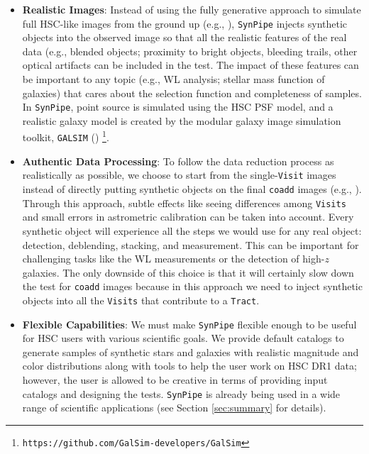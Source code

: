 \documentclass[useamsfonts]{pasj01}
\def\synpipe{\texttt{SynPipe}}
\def\coadd{\texttt{coadd}}
\def\tract{\texttt{Tract}}
\def\visit{\texttt{Visit}}
\def\visits{\texttt{Visits}}
\def\galsim{\texttt{G}{\scriptsize \texttt{AL}}\texttt{S}{\scriptsize \texttt{IM}}}
\begin{document}
    \begin{itemize}

        \item \textbf{Realistic Images}:
            Instead of using the fully generative approach to simulate full HSC-like
            images from the ground up (e.g., \citealt{Chang2015}), \synpipe{} injects
            synthetic objects into the observed image so that all the realistic
            features of the real data (e.g., blended objects; proximity to bright
            objects, bleeding trails, other optical artifacts can be included in the 
            test.
            The impact of these features can be important to any topic (e.g., WL 
            analysis; stellar mass function of galaxies) that cares about the selection 
            function and completeness of samples.
            In \synpipe{}, point source is simulated using the HSC PSF model,
            and a realistic galaxy model is created by the modular galaxy image
            simulation toolkit, \galsim{} (\citealt{Rowe2015})
            \footnote{\texttt{https://github.com/GalSim-developers/GalSim}}.
            
        \item \textbf{Authentic Data Processing}:
            To follow the data reduction process as realistically as possible, we choose to
            start from the single-\visit{} images instead of directly putting synthetic 
            objects on the final \coadd{} images (e.g., \citealt{Suchyta2016}).
            Through this approach, subtle effects like seeing differences among
            \visits{} and small errors in astrometric calibration can be taken
            into account.
            Every synthetic object will experience all the steps we would use for any 
            real object: detection, deblending, stacking, and measurement.
            This can be important for challenging tasks like the WL measurements
            or the detection of high-$z$ galaxies.
            The only downside of this choice is that it will certainly slow down the
            test for \coadd{} images because in this approach we need to inject 
            synthetic objects into all the \visits{} that contribute to a \tract{}.

        \item \textbf{Flexible Capabilities}:
            We must make \synpipe{} flexible enough to be useful for HSC users with 
            various scientific goals.
            We provide default catalogs to generate samples of synthetic stars
            and galaxies with realistic magnitude and color distributions along with
            tools to help the user work on HSC DR1 data; however, the user is allowed 
            to be creative in terms of providing input catalogs and designing the tests.
            \synpipe{} is already being used in a wide range of
            scientific applications (see Section \ref{sec:summary} for details).

    \end{itemize}
\end{document}
